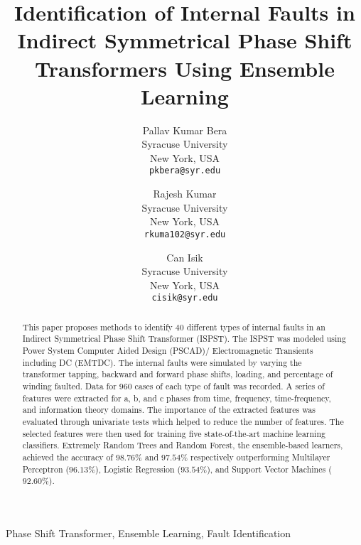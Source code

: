 \documentclass[conference]{IEEEtran}
\begin{document}
\title{Identification of Internal Faults in Indirect Symmetrical Phase Shift Transformers Using Ensemble Learning}
\author{Pallav Kumar Bera\\
Syracuse University\\
New York, USA\\
{\tt\small pkbera@syr.edu}
\and
Rajesh Kumar\\
Syracuse University\\
New York, USA\\
{\tt\small rkuma102@syr.edu}
\and
Can Isik\\
Syracuse University\\
New York, USA\\
{\tt\small cisik@syr.edu}}
\IEEEoverridecommandlockouts
{}
\maketitle
\IEEEpubidadjcol
\begin{abstract}
This paper proposes methods to identify $40$ different types of internal faults in an Indirect Symmetrical Phase Shift Transformer (ISPST). The ISPST was modeled using Power System Computer Aided Design (PSCAD)/ Electromagnetic Transients including DC (EMTDC). The internal faults were simulated by varying the transformer tapping, backward and forward phase shifts, loading, and percentage of winding faulted. Data for $960$ cases of each type of fault was recorded. A series of features were extracted for a, b, and c phases from time, frequency, time-frequency, and information theory domains. The importance of the extracted features was evaluated through univariate tests which helped to reduce the number of features. The selected features were then used for training five state-of-the-art machine learning classifiers. Extremely Random Trees and Random Forest, the ensemble-based learners, achieved the accuracy of $98.76\%$ and $97.54\%$ respectively outperforming Multilayer Perceptron ($96.13\%$), Logistic Regression ($93.54\%$), and Support Vector Machines ($92.60\%$). 

\end{abstract}

\begin{IEEEkeywords}
Phase Shift Transformer, Ensemble Learning, Fault Identification
\end{IEEEkeywords}
\end{document}
